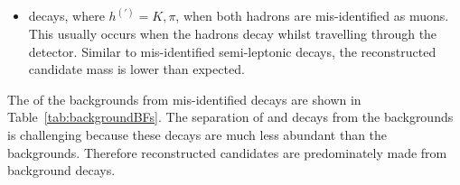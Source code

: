 \begin{itemize}
\item \bhh decays, where $ h^{(')}  = K, \pi$, when both hadrons are mis-identified as muons. This usually occurs when the hadrons decay whilst travelling through the detector. Similar to mis-identified semi-leptonic decays, the reconstructed \bsd candidate mass is lower than expected. %
\end{itemize}

The \BFs of the backgrounds from mis-identified decays are shown in Table~\ref{tab:backgroundBFs}. The separation of \bdmumu and \bsmumu decays from the backgrounds is challenging because these decays are much less abundant than the backgrounds. Therefore reconstructed candidates are predominately made from background decays.

